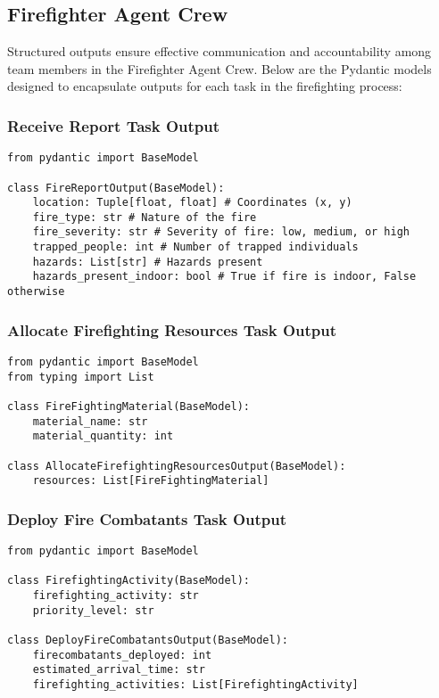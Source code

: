 \subsection{Firefighter Agent Crew}

Structured outputs ensure effective communication and accountability among team members in the Firefighter Agent Crew. Below are the Pydantic models designed to encapsulate outputs for each task in the firefighting process:

\subsubsection{Receive Report Task Output}
\begin{lstlisting}[caption={Pydantic model for Receive Report Task Output}]
from pydantic import BaseModel

class FireReportOutput(BaseModel):
    location: Tuple[float, float] # Coordinates (x, y)
    fire_type: str # Nature of the fire 
    fire_severity: str # Severity of fire: low, medium, or high
    trapped_people: int # Number of trapped individuals
    hazards: List[str] # Hazards present
    hazards_present_indoor: bool # True if fire is indoor, False otherwise
\end{lstlisting}


\subsubsection{Allocate Firefighting Resources Task Output}
\begin{lstlisting}[caption={Pydantic model for Allocate Firefighting Resources Task Output}]
from pydantic import BaseModel
from typing import List

class FireFightingMaterial(BaseModel):
    material_name: str
    material_quantity: int

class AllocateFirefightingResourcesOutput(BaseModel):
    resources: List[FireFightingMaterial]
\end{lstlisting}


\subsubsection{Deploy Fire Combatants Task Output}
\begin{lstlisting}[caption={Pydantic model for Deploy Fire Combatants Task Output}]
from pydantic import BaseModel

class FirefightingActivity(BaseModel):
    firefighting_activity: str
    priority_level: str

class DeployFireCombatantsOutput(BaseModel):
    firecombatants_deployed: int
    estimated_arrival_time: str
    firefighting_activities: List[FirefightingActivity]
\end{lstlisting}


